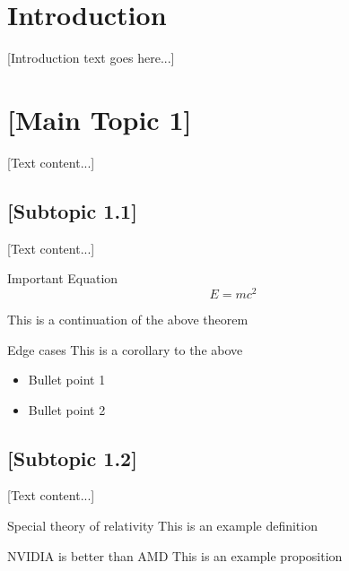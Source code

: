 \documentclass[12pt, a4paper]{extarticle}
\date{\today}
\begin{document}
\maketitle
\tableofcontents
\newpage


\section{Introduction}
[Introduction text goes here...]

\section{[Main Topic 1]}
[Text content...]

\subsection{[Subtopic 1.1]}
[Text content...]

\begin{theorem}{Important Equation}{}
$$
E = mc^2
$$
\end{theorem}

\begin{theoremc}
	This is a continuation of the above theorem
\end{theoremc}

\begin{corollary}{Edge cases}{}
	This is a corollary to the above
\end{corollary}

\begin{itemize}
    \item Bullet point 1
    \item Bullet point 2
\end{itemize}

\subsection{[Subtopic 1.2]}
[Text content...]

\begin{defn}{Special theory of relativity}{}
	This is an example definition
\end{defn}

\begin{prop}{NVIDIA is better than AMD}{}
	This is an example proposition
\end{prop}
\end{document}
